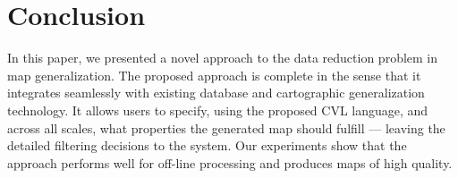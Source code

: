 \section{Conclusion}

In this paper, we presented a novel approach to the data reduction problem in map generalization. The proposed approach is complete in the sense that it integrates seamlessly with existing database and cartographic generalization technology. It allows users to specify, using the proposed CVL language, and across all scales, what properties the generated map should fulfill --- leaving the detailed filtering decisions to the system. Our experiments show that the approach performs well for off-line processing and produces maps of high quality.
